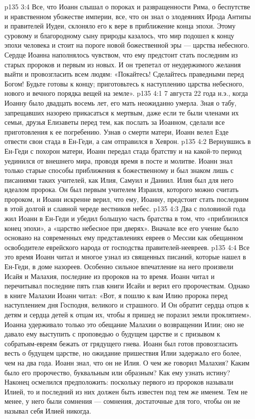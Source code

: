 \vs p135 3:4 Все, что Иоанн слышал о пороках и развращенности Рима, о беспутстве и нравственном убожестве империи, все, что он знал о злодеяниях Ирода Антипы и правителей Иудеи, склоняло его к вере в приближение конца эпохи. Этому суровому и благородному сыну природы казалось, что мир подошел к концу эпохи человека и стоит на пороге новой божественной эры --- царства небесного. Сердце Иоанна наполнялось чувством, что ему предстоит стать последним из старых пророков и первым из новых. И он трепетал от неудержимого желания выйти и провозгласить всем людям: «Покайтесь! Сделайтесь праведными перед Богом! Будьте готовы к концу; приготовьтесь к наступлению царства небесного, нового и вечного порядка вещей на земле».
\vs p135 4:1 7 августа 22 года н.э., когда Иоанну было двадцать восемь лет, его мать неожиданно умерла. Зная о табу, запрещавших назорею прикасаться к мертвым, даже если те были членами их семьи, друзья Елизаветы перед тем, как послать за Иоанном, сделали все приготовления к ее погребению. Узнав о смерти матери, Иоанн велел Езде отвести свои стада в Ен\hyp{}Геди, а сам отправился в Хеврон.
\vs p135 4:2 Вернувшись в Ен\hyp{}Геди с похорон матери, Иоанн передал стада братству и на какой\hyp{}то период уединился от внешнего мира, проводя время в посте и молитве. Иоанн знал только старые способы приближения к божественному и был знаком лишь с писаниями таких учителей, как Илия, Самуил и Даниил. Илия был для него идеалом пророка. Он был первым учителем Израиля, которого можно считать пророком, и Иоанн искренне верил, что ему, Иоанну, предстоит стать последним в этой долгой и славной череде вестников небес.
\vs p135 4:3 Два с половиной года жил Иоанн в Ен\hyp{}Геди и убедил большую часть братства в том, что «приблизился конец эпохи», а «царство небесное при дверях». Вначале все его учение было основано на современных ему представлениях евреев о Мессии как обещанном освободителе еврейского народа от господства правителей\hyp{}неевреев.
\vs p135 4:4 Все это время Иоанн читал и многое узнал из священных писаний, которые нашел в Ен\hyp{}Геди, в доме назореев. Особенно сильное впечатление на него произвели Исайя и Малахия, последние из пророков на то время. Иоанн читал и перечитывал последние пять глав книги Исайи и верил его пророчествам. Однако в книге Малахии Иоанн читал: «Вот, я пошлю к вам Илию пророка перед наступлением дня Господня, великого и страшного. И Он обратит сердца отцов к детям и сердца детей к отцам их, чтобы я пришед не поразил земли проклятием». Иоанна удерживало только это обещание Малахии о возвращении Илии; оно не давало ему выступить с проповедью о будущем царстве и с призывом к собратьям\hyp{}евреям бежать от грядущего гнева. Иоанн был готов провозгласить весть о будущем царстве, но ожидание пришествия Илии задержало его более, чем на два года. Иоанн знал, что он не Илия. О чем же говорил Малахия? Каким было его пророчество, буквальным или образным? Как ему узнать истину? Наконец осмелился предположить: поскольку первого из пророков называли Илией, то и последний из них должен быть известен под тем же именем. Тем не менее, у него были сомнения --- сомнения, достаточные для того, чтобы он не называл себя Илией никогда.

